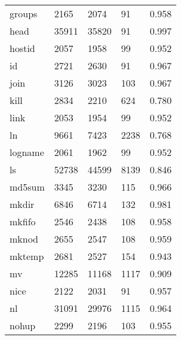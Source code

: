 \begin{longtable}{lp{3.0cm}p{3.0cm}p{3.0cm}p{3.0cm}}
groups    &                     2165 &         2074 &            91 &                    0.958 \\
head      &                    35911 &        35820 &            91 &                    0.997 \\
hostid    &                     2057 &         1958 &            99 &                    0.952 \\
id        &                     2721 &         2630 &            91 &                    0.967 \\
join      &                     3126 &         3023 &           103 &                    0.967 \\
kill      &                     2834 &         2210 &           624 &                    0.780 \\
link      &                     2053 &         1954 &            99 &                    0.952 \\
ln        &                     9661 &         7423 &          2238 &                    0.768 \\
logname   &                     2061 &         1962 &            99 &                    0.952 \\
ls        &                    52738 &        44599 &          8139 &                    0.846 \\
md5sum    &                     3345 &         3230 &           115 &                    0.966 \\
mkdir     &                     6846 &         6714 &           132 &                    0.981 \\
mkfifo    &                     2546 &         2438 &           108 &                    0.958 \\
mknod     &                     2655 &         2547 &           108 &                    0.959 \\
mktemp    &                     2681 &         2527 &           154 &                    0.943 \\
mv        &                    12285 &        11168 &          1117 &                    0.909 \\
nice      &                     2122 &         2031 &            91 &                    0.957 \\
nl        &                    31091 &        29976 &          1115 &                    0.964 \\
nohup     &                     2299 &         2196 &           103 &                    0.955 \\

\end{longtable}
